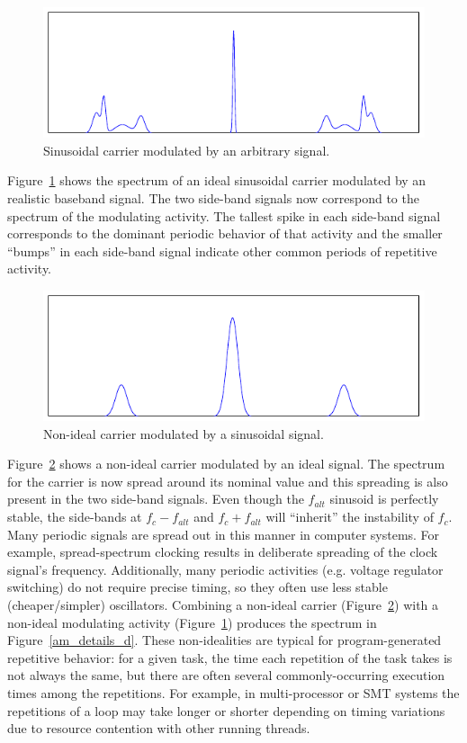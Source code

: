 \begin{figure}[thb]
  \centering
    \includegraphics[scale=.95]{../fase/Data/am_details_b.pdf}
  \caption{Sinusoidal carrier modulated by an arbitrary signal.}
  \label{am_details_b}
\end{figure}

Figure~\ref{am_details_b} shows the spectrum of an ideal sinusoidal carrier modulated by an realistic baseband signal. The two side-band signals now correspond to the spectrum of the modulating activity. The tallest spike in each side-band signal corresponds to the dominant periodic behavior of that activity and the smaller ``bumps'' in each side-band signal indicate other common periods of repetitive activity. 

\begin{figure}[h]
  \centering
    \includegraphics[scale=.95]{../fase/Data/am_details_c.pdf}
  \caption{Non-ideal carrier modulated by a sinusoidal signal.}
  \label{am_details_c}
\end{figure}

Figure~\ref{am_details_c} shows a non-ideal carrier modulated by an ideal signal. The spectrum for the carrier is now spread around its nominal value and this spreading is also present in the two side-band signals. Even though the $f_{alt}$ sinusoid is perfectly stable, the side-bands at $f_c - f_{alt}$ and $f_c + f_{alt}$ will ``inherit'' the instability of $f_c$. Many periodic signals are spread out in this manner in computer systems. For example, spread-spectrum clocking results in deliberate spreading of the clock signal's frequency. Additionally, many periodic activities (e.g. voltage regulator switching) do not require precise timing, so they often use less stable (cheaper/simpler) oscillators. Combining a non-ideal carrier (Figure~\ref{am_details_c}) with a non-ideal modulating activity (Figure~\ref{am_details_b}) produces the spectrum in Figure~\ref{am_details_d}. These non-idealities are typical for program-generated repetitive behavior: for a given task, the time each repetition of the task takes is not always the same, but there are often several commonly-occurring execution times among the repetitions. For example, in multi-processor or SMT systems the repetitions of a loop may take longer or shorter depending on timing variations due to resource contention with other running threads. 

